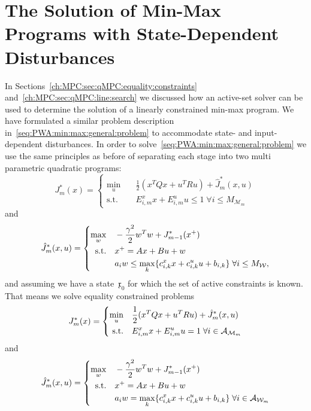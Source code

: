 \section{The Solution of Min-Max Programs with State-\-Dependent Disturbances}\label{ch:MPC:sec:state:dist:solution}
%
%
%
\mysplit In Sections~\ref{ch:MPC:sec:qMPC:equality:constraints} and~\ref{ch:MPC:sec:qMPC:line:search} we discussed how an active-set solver can be used to determine the solution of a linearly constrained min-max program.
%
We have formulated a similar problem description in~\eqref{seq:PWA:min:max:general:problem} to accommodate state- and input-dependent disturbances.
%
In order to solve~\eqref{seq:PWA:min:max:general:problem} we use the same principles as before of separating each stage into two multi parametric quadratic programs:
%
\begin{equation}
	J_m^\ast(x) = \left\{\begin{aligned}\min_u&\quad \frac{1}{2} (x^TQx + u^TRu) + \hat J_m^\ast(x,u)\\
	\text{s.t.}& \quad E_{i,m}^x x+ E_{i,m}^u u \leq 1\;\forall i\leq M_{\mathcal M_m}\end{aligned}\right.
\end{equation}
%
and
%
\begin{equation}
	\hat J_m^\ast(x,u) = \left\{\begin{aligned}\max_w&\quad -\frac{\gamma^2}{2}w^Tw + J_{m-1}^\ast(x^+)\\
	\text{s.t.}&\quad x^+=Ax+Bu+w \\
	&\quad a_i w\leq \max_{k}\{c_{i,k}^x x+c_{i,k}^u u + b_{i,k}\}\; \forall i\leq M_{\mathcal W},\end{aligned}\right.
\end{equation}
%
and assuming we have a state~$\mathfrak{x}_0$ for which the set of active constraints is known. 
%
That means we solve equality constrained problems
%
\begin{equation}
	J_m^\ast(x) = \left\{\begin{aligned}\min_u&\quad \frac{1}{2} (x^TQx + u^TRu) + \hat J_m^\ast(x,u)\\
	\text{s.t.}& \quad E_{i,m}^x x+ E_{i,m}^u u = 1\;\forall i\in\mathcal A_{\mathcal M_m}\end{aligned}\right.
\end{equation}
%
and
%
\begin{equation}
	\hat J_m^\ast(x,u) = \left\{\begin{aligned}\max_w&\quad -\frac{\gamma^2}{2}w^Tw + J_{m-1}^\ast(x^+)\\
	\text{s.t.}&\quad x^+=Ax+Bu+w \\
	&\quad a_i w= \max_{k}\{c_{i,k}^x x+c_{i,k}^u u + b_{i,k}\}\; \forall i\in\mathcal A_{\mathcal W_m}\end{aligned}\right.
\end{equation}

